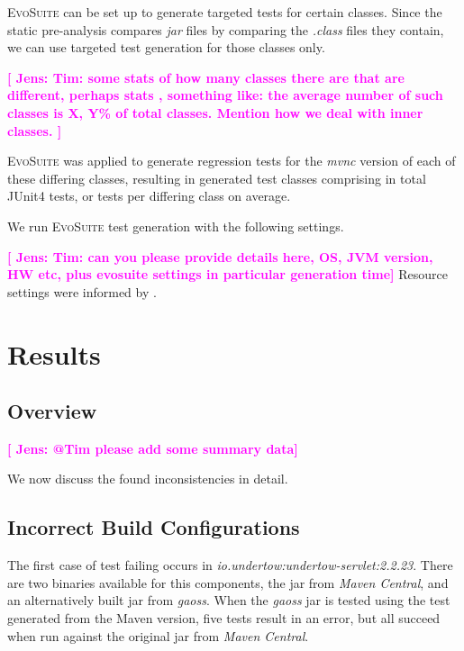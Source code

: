 \documentclass[conference]{IEEEtran}
\makeatletter
\newcommand{\evosuite}{\textsc{EvoSuite}\@\xspace}
\newcommand{\jens}[1]{\textbf{\textcolor{magenta}{[ \ding{46}Jens: #1]}}}
\newcommand{\inputgen}[1]{\unskip}
\makeatother
\begin{document}
\evosuite can be set up to generate targeted tests for certain classes. Since the static pre-analysis compares \textit{jar} files by comparing the \textit{.class} files they contain, we can use targeted test generation for those classes only.   

\jens{Tim: some stats of how many classes there are that are different, perhaps stats , something like: the average number of such classes is X, Y\% of total classes. Mention how we deal with inner classes.  }

\evosuite was applied to generate regression tests for the \textit{mvnc} version of each of these \inputgen{num-class-pairs-after-invokevirtual-invokeinterface} differing classes, resulting in \inputgen{num-classes-with-generated-tests} generated test classes comprising in total \inputgen{num-generated-tests} JUnit4 tests, or \inputgen{avg-tests-per-class} tests per differing class on average.

We run \evosuite test generation with the following settings. 

\jens{Tim: can you please provide details here, OS, JVM version, HW etc, plus evosuite settings in particular generation time}
Resource settings were informed by \cite{jahangirova2023sbft}. 


\section{Results}
\label{sec:results}

\subsection{Overview}

\jens{@Tim please add some summary data}

We now discuss the found inconsistencies in detail.

\subsection{Incorrect Build Configurations}


The first case of test failing occurs in \textit{io.undertow:undertow-servlet:2.2.23}. There are two binaries available for this components, the jar from \textit{Maven Central}, and an alternatively built jar from \textit{gaoss}. When the  \textit{gaoss} jar is tested using the test generated from the Maven version, five tests result in an error, but all succeed when run against the original jar from \textit{Maven Central}.
\end{document}
